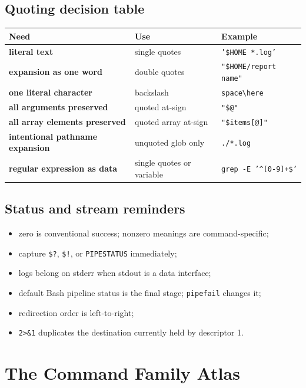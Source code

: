 \documentclass[11pt,oneside,openany]{book}
\begin{document}
\section{Quoting decision table}
\begin{center}
\begin{tabularx}{0.96\textwidth}{>{\bfseries}p{}X X}
\toprule
Need & Use & Example \\
\midrule
literal text & single quotes & \texttt{'\$HOME *.log'} \\
expansion as one word & double quotes & \texttt{"\$HOME/report name"} \\
one literal character & backslash & \texttt{space\textbackslash here} \\
all arguments preserved & quoted at-sign & \texttt{"\$@"} \\
all array elements preserved & quoted array at-sign & \texttt{"\${items[@]}"} \\
intentional pathname expansion & unquoted glob only & \texttt{./*.log} \\
regular expression as data & single quotes or variable & \texttt{grep -E '\textasciicircum{}[0-9]+\$'} \\
\bottomrule
\end{tabularx}
\end{center}

\section{Status and stream reminders}
\begin{itemize}
  \item zero is conventional success; nonzero meanings are command-specific;
  \item capture \texttt{\$?}, \texttt{\$!}, or \texttt{PIPESTATUS} immediately;
  \item logs belong on stderr when stdout is a data interface;
  \item default Bash pipeline status is the final stage; \texttt{pipefail} changes it;
  \item redirection order is left-to-right;
  \item \texttt{2>\&1} duplicates the destination currently held by descriptor 1.
\end{itemize}

\chapter{The Command Family Atlas}
\end{document}
